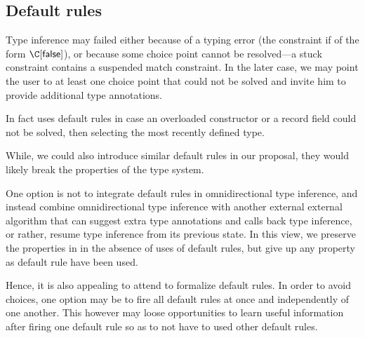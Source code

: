 \documentclass[acmsmall,screen,nonacm,review]{acmart}
\begin{document}



\subsection{Default rules}


Type inference may failed either because of a typing error (the constraint
if of the form $\C \where \cfalse$), or because some choice point cannot be
resolved---a stuck constraint contains a suspended match constraint.
%
In the later case, we may point the user to at least one choice point that
could not be solved and invite him to provide additional type annotations.

In fact \OCaml uses default rules in case an overloaded constructor or a record
field could not be solved, then selecting the most recently defined type.

While, we could also introduce similar default rules in our proposal, they
would likely break the properties of the type system.

One option is not to integrate default rules in omnidirectional type
inference, and instead combine omnidirectional type inference with another
external external algorithm that can suggest extra type annotations and
calls back type inference, or rather, resume type inference from its
previous state.  In this view, we preserve the properties in
in the absence of uses of default rules, but give up any property
as default rule have been used.

Hence, it is also appealing to attend to formalize default rules.  In order
to avoid choices, one option may be to fire all default rules at once and
independently of one another.  This however may loose opportunities to learn
useful information after firing one default rule so as to not have to used
other default rules.
\end{document}

